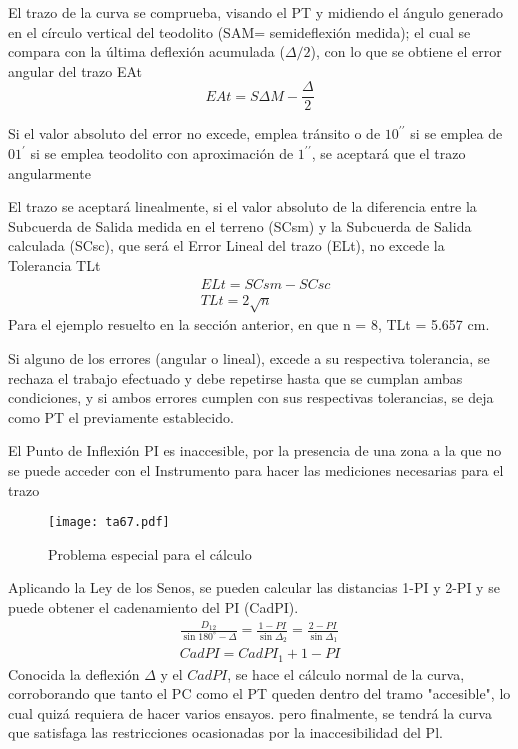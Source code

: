 \begin{enumerate}
    El trazo de la curva se comprueba, visando el PT y midiendo el ángulo generado en el círculo vertical del teodolito (SAM= semideflexión medida); el cual se compara con la última deflexión acumulada ($\Delta/2$), con lo que se obtiene el error angular del trazo EAt
    \begin{equation*}
            EAt=S\Delta M - \frac{\Delta}{2} 
    \end{equation*}
    
    Si el valor absoluto del error no excede, emplea tránsito o de $10^{\prime\prime}$ si se emplea de $01^{\prime}$ si se emplea teodolito con aproximación de $1^{\prime\prime}$, se aceptará que el trazo angularmente
\end{enumerate}

El trazo se aceptará linealmente, si el valor absoluto de la diferencia entre la Subcuerda de Salida medida en el terreno (SCsm) y la Subcuerda de Salida calculada (SCsc), que será el Error Lineal del trazo (ELt), no excede la Tolerancia TLt
\begin{align}
    &ELt = SCsm - SCsc\\
    &TLt = 2 \sqrt{n}
\end{align}
Para el ejemplo resuelto en la sección anterior, en que n = 8, TLt = 5.657 cm.

Si alguno de los errores (angular o lineal), excede a su respectiva tolerancia, se rechaza el trabajo efectuado y debe repetirse hasta que se cumplan ambas condiciones, y si ambos errores cumplen con sus respectivas tolerancias, se deja como PT el previamente establecido.

El Punto de Inflexión PI es inaccesible, por la presencia de una zona a la que no se puede acceder con el Instrumento para hacer las mediciones necesarias para el trazo
\begin{figure}[h!]
\centering
  \texttt{[image: ta67.pdf]}
  \caption{Problema especial para el cálculo}
  \label{ta67}
\end{figure}
Aplicando la Ley de los Senos, se pueden calcular las distancias 1-PI y 2-PI y se puede obtener el cadenamiento del PI (CadPI).
\begin{align*}
    \frac{D_{12}}{\sin{180^{\circ} -\Delta}} = \frac{1 - PI}{\sin{\Delta_2}} = \frac{2 - PI}{\sin{\Delta_1}}\\
    CadPI = CadPI_1 +1 - PI
\end{align*}
Conocida la deflexión $\Delta$ y el $CadPI$, se hace el cálculo normal de la curva, corroborando que tanto el PC como el PT queden dentro del tramo "accesible", lo cual quizá requiera de hacer varios ensayos. pero finalmente, se tendrá la curva que satisfaga las restricciones ocasionadas por la inaccesibilidad del Pl.


